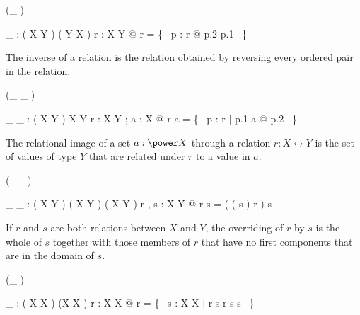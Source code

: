 \documentclass[draft,a4paper,10pt,wd]{isov2}
\begin{document}

\begin{zed}
\function (\_ \inv)
\end{zed}

\begin{gendef}[X,Y]
\_ \inv : ( X \rel Y ) \fun ( Y \rel X )
\where
\forall r : X \rel Y @ r \inv = \{~ p : r @ p.2 \mapsto p.1 ~\}
\end{gendef}

The inverse of a relation is the relation obtained by reversing every
ordered pair in the relation.


\begin{zed}
\function (\_ \limg \_ \rimg)
\end{zed}

\begin{gendef}[X,Y]
\_ \limg \_ \rimg : ( X \rel Y ) \cross \power X \fun \power Y
\where
\forall r : X \rel Y ; a : \power X @ r \limg a \rimg = \{~ p : r | p.1 \in a @ p.2 ~\}
\end{gendef}

The relational image of a set $a : \power X$ through a relation $r : X \rel Y$
is the set of values of type $Y$ that are related under $r$ to a value in $a$.


\begin{zed}
 \leftassoc (\_ \oplus \_)
\end{zed}

\begin{gendef}[X,Y]
\_ \oplus \_ : ( X \rel Y ) \cross ( X \rel Y ) \fun ( X \rel Y )
\where
\forall r , s : X \rel Y @ r \oplus s = ( ( \dom s ) \ndres r ) \cup s
\end{gendef}

If $r$ and $s$ are both relations between $X$ and $Y$,
the overriding of $r$ by $s$
is the whole of $s$ together with those members of $r$
that have no first components that are in the domain of $s$.


\begin{zed}
\function (\_ \plus)
\end{zed}

\begin{gendef}[X]
\_ \plus : ( X \rel X ) \fun (X \rel X )
\where
\forall r : X \rel X @
r \plus = \bigcap \{~ s : X \rel X | r \subseteq s \land r \comp s \subseteq s ~\}
\end{gendef}
\end{document}
